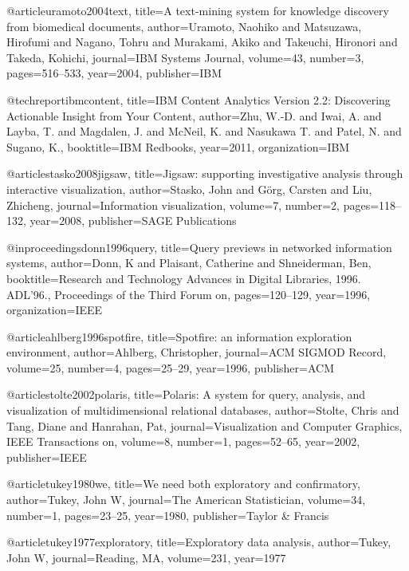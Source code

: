 @article{uramoto2004text,
  title={A text-mining system for knowledge discovery from biomedical documents},
  author={Uramoto, Naohiko and Matsuzawa, Hirofumi and Nagano, Tohru and Murakami, Akiko and Takeuchi, Hironori and Takeda, Kohichi},
  journal={IBM Systems Journal},
  volume={43},
  number={3},
  pages={516--533},
  year={2004},
  publisher={IBM}
}

@techreport{ibmcontent,
  title={IBM Content Analytics Version 2.2: Discovering Actionable Insight from Your Content},
  author={Zhu, W.-D. and Iwai, A. and Layba, T. and Magdalen, J. and McNeil, K. and Nasukawa T. and Patel, N. and Sugano, K.},
  booktitle={IBM Redbooks},
  year={2011},
  organization={IBM}
}

@article{stasko2008jigsaw,
  title={Jigsaw: supporting investigative analysis through interactive visualization},
  author={Stasko, John and G{\"o}rg, Carsten and Liu, Zhicheng},
  journal={Information visualization},
  volume={7},
  number={2},
  pages={118--132},
  year={2008},
  publisher={SAGE Publications}
}

@inproceedings{donn1996query,
  title={Query previews in networked information systems},
  author={Donn, K and Plaisant, Catherine and Shneiderman, Ben},
  booktitle={Research and Technology Advances in Digital Libraries, 1996. ADL'96., Proceedings of the Third Forum on},
  pages={120--129},
  year={1996},
  organization={IEEE}
}

@article{ahlberg1996spotfire,
  title={Spotfire: an information exploration environment},
  author={Ahlberg, Christopher},
  journal={ACM SIGMOD Record},
  volume={25},
  number={4},
  pages={25--29},
  year={1996},
  publisher={ACM}
}

@article{stolte2002polaris,
  title={Polaris: A system for query, analysis, and visualization of multidimensional relational databases},
  author={Stolte, Chris and Tang, Diane and Hanrahan, Pat},
  journal={Visualization and Computer Graphics, IEEE Transactions on},
  volume={8},
  number={1},
  pages={52--65},
  year={2002},
  publisher={IEEE}
}

@article{tukey1980we,
  title={We need both exploratory and confirmatory},
  author={Tukey, John W},
  journal={The American Statistician},
  volume={34},
  number={1},
  pages={23--25},
  year={1980},
  publisher={Taylor \& Francis}
}

@article{tukey1977exploratory,
  title={Exploratory data analysis},
  author={Tukey, John W},
  journal={Reading, MA},
  volume={231},
  year={1977}
}